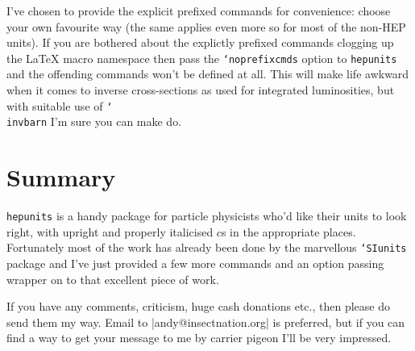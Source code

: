 \documentclass[12pt]{article}
\newcommand{\hepunits}{\texttt{hepunits}\xspace}
\newcommand{\texcmd}[1]{\texttt{\char`\\#1}}
\newcommand{\texopt}[1]{\texttt{\char`#1}}
\newcommand{\texpkg}[1]{\texttt{\char`#1}}
\begin{document}
I've chosen to provide the explicit prefixed commands for convenience: choose
your own favourite way (the same applies even more so for most of the non-HEP
units). If you are bothered about the explictly prefixed commands clogging up
the \LaTeX{} macro namespace then pass the \texopt{noprefixcmds} option to
\hepunits and the offending commands won't be defined at all. This will make
life awkward when it comes to inverse cross-sections as used for integrated
luminosities, but with suitable use of \texcmd{invbarn} I'm sure you can make
do.

\section{Summary}
\hepunits is a handy package for particle physicists who'd like their units to
look right, with upright  and properly italicised $c$s in the
appropriate places. Fortunately most of the work has already been done by the
marvellous \texpkg{SIunits} package and I've just provided a few more commands
and an option passing wrapper on to that excellent piece of work.

If you have any comments, criticism, huge cash donations etc., then please do
send them my way. Email to |andy@insectnation.org| is preferred, but if you can
find a way to get your message to me by carrier pigeon I'll be very impressed.
\end{document}
